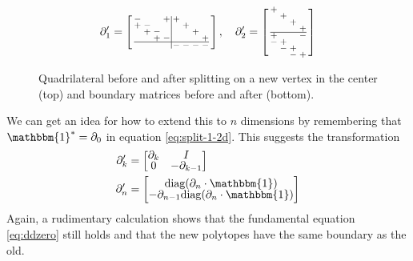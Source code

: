 \documentclass[twocolumn]{article}
\makeatletter
\newenvironment{smallarray}[1]
 {\null\,\vcenter\bgroup\scriptsize
  \renewcommand{\arraystretch}{0.7}%
  \arraycolsep=.13885em
  \hbox\bgroup$\array{@{}#1@{}}}
 {\endarray$\egroup\egroup\,\null}
\makeatother
\begin{document}
\begin{figure}[h]
    \begin{equation*}
        \partial_1' = \left[\begin{smallarray}{cccc|cccc}
            - &   &   & + & + &   &   &   \\
            + & - &   &   &   & + &   &   \\
              & + & - &   &   &   & + &   \\
              &   & + & - &   &   &   & + \\
            \hline
              &   &   &   & - & - & - & -
        \end{smallarray}\right], \quad
        \partial_2' = \left[\begin{smallarray}{cccc}
            + &   &   &   \\
              & + &   &   \\
              &   & + &   \\
              &   &   & + \\
            \hline
            + &   &   & - \\
            - & + &   &   \\
              & - & + &   \\
              &   & - & +
        \end{smallarray}\right]
    \end{equation*}

    \caption{Quadrilateral before and after splitting on a new vertex in the center (top) and boundary matrices before and after (bottom).}
    \label{fig:split-transformation}
\end{figure}

We can get an idea for how to extend this to $n$ dimensions by remembering that $\mathbbm{1}^* = \partial_0$ in equation \eqref{eq:split-1-2d}.
This suggests the transformation
\begin{align}
    \partial_k' & = \left[\begin{matrix}\partial_k & I \\ 0 & -\partial_{k - 1}\end{matrix}\right] \label{eq:split-k} \\
    \partial_n' & = \left[\begin{matrix}\text{diag}(\partial_n\cdot\mathbbm{1}) \\ -\partial_{n - 1}\text{diag}(\partial_n\cdot\mathbbm{1})\end{matrix}\right] \label{eq:split-n}
\end{align}
Again, a rudimentary calculation shows that the fundamental equation \eqref{eq:ddzero} still holds and that the new polytopes have the same boundary as the old.
\end{document}
